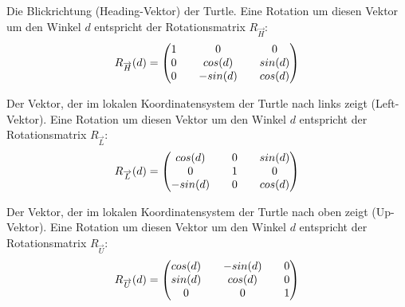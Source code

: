 \begin{description}[5cm]
		\item[\boldmath$\overrightarrow{H}$]Die Blickrichtung (Heading-Vektor) der Turtle. Eine Rotation um diesen Vektor um den Winkel $d$ entspricht der Rotationsmatrix $R_{\overrightarrow{H}}$:\\
		\begin{equation}
		R_{\overrightarrow{H}}(d) = 
		\setlength\arraycolsep{10pt}
		\begin{pmatrix}
		1	 	& 0			& 0 \\
		0		& cos(d)	& sin(d) \\
		0 		& -sin(d)	& cos(d)
		\end{pmatrix}	
		\label{eq:rotH}
		\end{equation} 
		
		\item[\boldmath$\overrightarrow{L}$] Der Vektor, der im lokalen Koordinatensystem der Turtle nach links zeigt (Left-Vektor). Eine Rotation um diesen Vektor um den Winkel $d$ entspricht der Rotationsmatrix $R_{\overrightarrow{L}}$:\\
		\begin{equation}
		R_{\overrightarrow{L}}(d) = 
		\setlength\arraycolsep{10pt}
		\begin{pmatrix}
		cos(d) 	& 0		 	& sin(d) \\
		0		& 1			& 0 \\
		-sin(d)	& 0 		&  cos(d)
		\end{pmatrix}	
		\label{eq:rotL}
		\end{equation} 
		
		\item[\boldmath$\overrightarrow{U}$]Der Vektor, der im lokalen Koordinatensystem der Turtle nach oben zeigt (Up-Vektor). Eine Rotation um diesen Vektor um den Winkel $d$ entspricht der Rotationsmatrix $R_{\overrightarrow{U}}$:\\
		\begin{equation}
		R_{\overrightarrow{U}}(d) = 
		\setlength\arraycolsep{10pt}
		\begin{pmatrix}
		cos(d) 	& -sin(d) 	& 0 \\
		sin(d)	& cos(d) 	& 0 \\
		0 		& 0 		& 1
		\end{pmatrix}	
		\label{eq:rotU}
		\end{equation} 
		
	
\end{description}
\cite[S.19]{ABOP:04} \cite[S.69]{Deussen:05} \\

